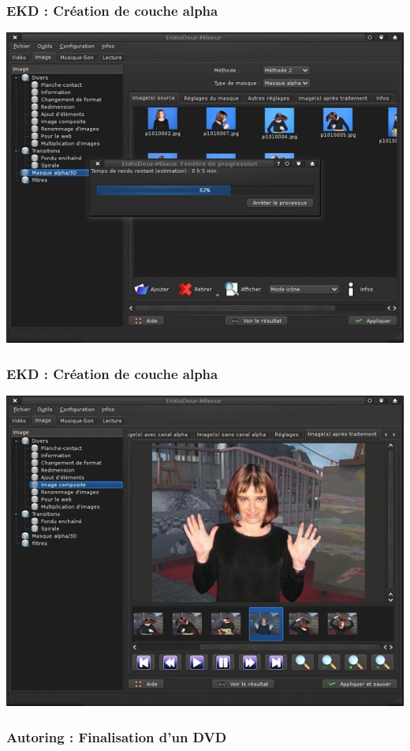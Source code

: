 \begin{frame}
\frametitle{EKD : Création de couche alpha}
\includegraphics[scale=0.50]{ressources/ekd_linux_alpha1.jpg}
\end{frame}

\begin{frame}
\frametitle{EKD : Création de couche alpha}
\includegraphics[scale=0.50]{ressources/ekd_linux_alpha2.jpg}
\end{frame}


\begin{frame}
\frametitle{Autoring : Finalisation d'un DVD}
\end{frame}

